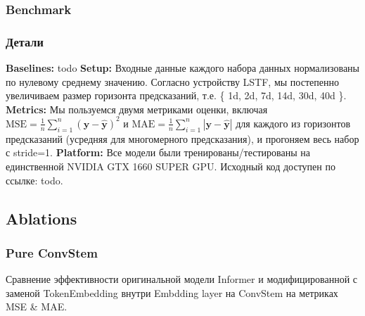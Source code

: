 
\subsubsection{Benchmark}


\subsubsection{Детали}

\textbf{Baselines:} {\color{red} todo}
\textbf{Setup:} Входные данные каждого набора данных нормализованы по нулевому среднему значению. 
Согласно устройству LSTF, мы постепенно увеличиваем размер горизонта предсказаний, 
т.е. \{ 1d, 2d, 7d, 14d, 30d, 40d \}.
\textbf{Metrics:} Мы пользуемся двумя метриками оценки, включая 
$\text{MSE}=\frac{1}{n} \sum_{i=1}^n (\bm{y} - \hat{\bm{y}})^2$ 
и $\text{MAE}=\frac{1}{n} \sum_{i=1}^n |\bm{y} - \hat{\bm{y}}|$ 
для каждого из горизонтов предсказаний (усредняя для многомерного 
предсказания), и прогоняем весь набор с stride=1.
\textbf{Platform:}
Все модели были тренированы/тестированы на единственной 
NVIDIA GTX 1660 SUPER GPU. Исходный код доступен 
по ссылке: {\color{red} todo}.

\subsection{Ablations}

\subsubsection{Pure ConvStem}

Сравнение эффективности оригинальной модели Informer и модифицированной
с заменой TokenEmbedding внутри Embdding layer на ConvStem 
на метриках MSE \& MAE.

